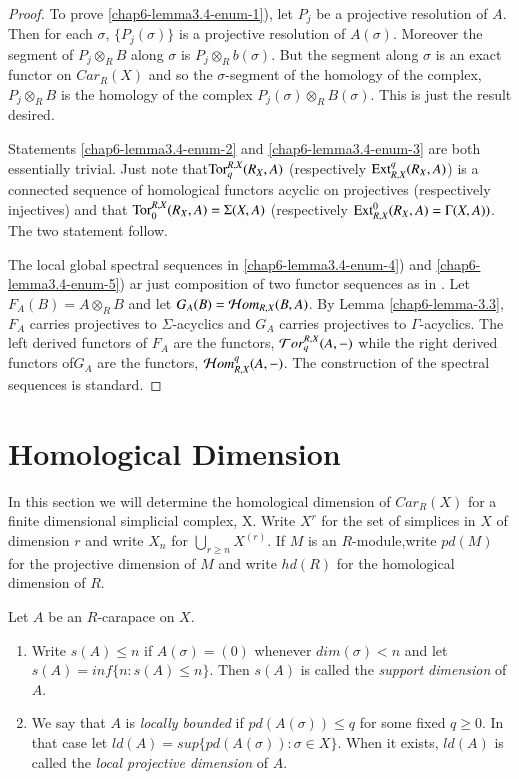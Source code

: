 \begin{proof}
To prove \ref{chap6-lemma3.4-enum-1}), let ${P_{j}}$ be a projective resolution of $A$. Then for each $\sigma$, $\{P_{j}(\sigma)\}$ is a projective resolution of $A(\sigma)$. Moreover the segment of $P_{j}\otimes_{R}B$ along $\sigma$ is $P_{j}\otimes_{R}b(\sigma)$. But the segment along $\sigma$ is an exact functor on $C ar_{R}(X)$ and so the $\sigma$-segment of the homology of the complex, $P_{j}\otimes_{R}B$ is the homology of the complex $P_{j}(\sigma) \otimes_{R}B(\sigma)$. This is just the result desired.

Statements \ref{chap6-lemma3.4-enum-2} and \ref{chap6-lemma3.4-enum-3} are both essentially trivial. Just note that\break $\operatorname{Tor}_{q}^{R, X}(R_{X}, A)$ (respectively $\operatorname{Ext}_{R,X}^{q}(R_{X}, A)$) is a connected sequence of homological functors acyclic on projectives (respectively injectives) and that $\operatorname{Tor}_{0}^{R,X}(R_{X},A)=\Sigma(X, A)$ (respectively $\operatorname{Ext}_{R,X}^{0}(R_{X},A) = \Gamma(X,A))$. The two statement follow.

The local global spectral sequences in \ref{chap6-lemma3.4-enum-4}) and \ref{chap6-lemma3.4-enum-5}) ar just composition of two functor sequences as in \cite{chap6-keyGr}. Let $F_{A}(B) = A\otimes_{R}B$ and let $G_{A}(B) = \mathcal{H} om_{R,X}(B,A)$. By Lemma \ref{chap6-lemma-3.3}, $F_{A}$ carries projectives to $\Sigma$-acyclics and $G_{A}$ carries projectives to $\Gamma$-acyclics. The left derived functors of $F_{A}$ are the functors, $\mathcal{T} or_{q}^{R,X}(A,-)$ while the right derived functors of$G_{A}$ are the functors, $\mathcal{H} om_{R,X}^{q}(A, -)$. The construction of the spectral sequences is standard.
\end{proof}

\section{Homological Dimension}\label{chap6-sec-4}
\pageoriginale

In this section we will determine the homological dimension of $C ar_{R}(X)$ for a finite dimensional simplicial complex, X. Write $X^{r}$ for the set of simplices in $X$ of dimension $r$ and write $X_{n}$ for $\bigcup_{r\geq n}X^{(r)}$. If $M$ is an $R$-module,write $pd(M)$ for the projective dimension of $M$ and write $hd(R)$ for the homological dimension of $R$. 

\begin{definition}\label{chap6-defin-4.1}
Let $A$ be an $R$-carapace on $X$.
    \begin{enumerate}[(1)]
    \item Write $s(A)\leq n$ if $A(\sigma) = (0)$ whenever $dim(\sigma) < n$ and let $s(A) = inf\{n: s(A) \leq n\}$. Then $s(A)$ is called the \textit{support dimension} of $A$.\label{chap6-defin1-enum-1}
    \item We say that $A$ is \textit{locally bounded} if $pd(A(\sigma)) \leq q$ for some fixed $q \geq 0$. In that case let $ld(A)=sup\{pd(A(\sigma)) : \sigma \in X\}$. When it exists, $ld(A)$ is called the \textit{local projective dimension} of $A$.\label{chap6-defin1-enum-2}
    \end{enumerate}
\end{definition}

